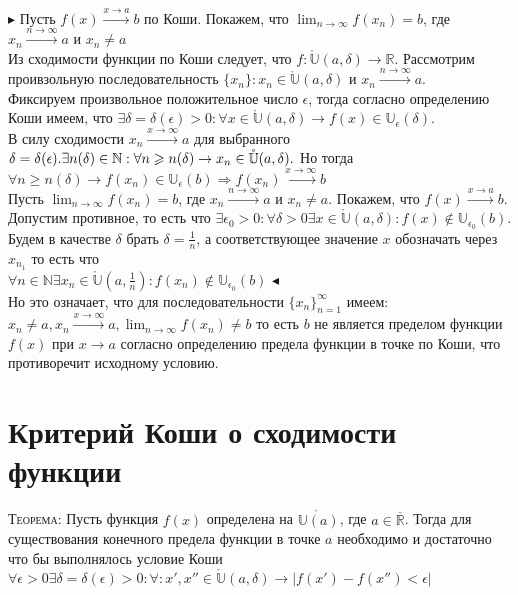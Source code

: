 \documentclass[14pt]{article}
\begin{document}
        $\blacktriangleright$ Пусть $f(x) \xrightarrow{x \rightarrow a} b $ по Коши. Покажем, что $\lim_{n \rightarrow \infty} f(x_n) = b$, где $x_n \xrightarrow{n\rightarrow \infty} a$ и $x_n \ne a$ \\  Из сходимости функции по Коши следует, что $f: \mathring{\mathbb{U}}(a, \delta) \rightarrow \mathbb{R}$. Рассмотрим проивзольную последовательность $\{x_n\} : x_n \in \mathring{\mathbb{U}}(a, \delta)$ и $x_n \xrightarrow{n \rightarrow \infty} a$.\\ Фиксируем произвольное положительное число $\epsilon$, тогда согласно определению Коши имеем, что $\exists \delta = \delta(\epsilon) > 0: \forall x \in \mathring{\mathbb{U}}(a,\delta) \rightarrow f(x) \in \mathbb{U}_\epsilon (\delta)$. \\ В силу сходимости $x_n \xrightarrow{x \rightarrow \infty} a $ для выбранного $\delta = \delta(\epsilon). \\ \exists n(\delta) \in \mathbb{N} : \forall n \geqslant n(\delta) \rightarrow x_n \in \mathring{\mathbb{U}}(a, \delta). $ Но тогда $\forall n \geqslant n(\delta) \rightarrow f(x_n) \in \mathbb{U}_\epsilon(b) \Rightarrow f(x_n) \xrightarrow{x\rightarrow\infty} b $ 
        \\ Пусть $\lim_{n\rightarrow \infty} f(x_n) = b$, где $x_n \xrightarrow{n\rightarrow \infty} a$ и $x_n \ne a$. Покажем, что $f(x) \xrightarrow{x\rightarrow a}b$. \\ Допустим противное, то есть что  $\exists \epsilon_0 > 0: \forall \delta > 0 \exists x \in \mathring{\mathbb{U}} (a, \delta) : f(x) \notin \mathbb{U}_{\epsilon_0}(b)$. \\  Будем в качестве $\delta$ брать $\delta=\frac{1}{n}$, а соответствующее значение $x$ обозначать через $x_{n_1} $ то есть что \\ $\forall n \in \mathbb{N} \exists x_n \in \mathring{\mathbb{U}} (a, \frac{1}{n}):f(x_n)\notin \mathbb{U}_{\epsilon_0}(b)$ $\blacktriangleleft$\\ Но это означает, что для последовательности $\{x_n\}^\infty_{n=1}$ имеем: $x_n \ne a, x_n \xrightarrow{x\rightarrow\infty} a, \lim_{n\rightarrow\infty} f(x_n) \ne b$ то есть $b$ не является пределом функции $f(x)$ при $x\rightarrow a$ согласно определению предела функции в точке по Коши, что противоречит исходному условию.

    \section{Критерий Коши о сходимости функции}
        \textsc{Теорема:} Пусть функция $f(x)$ определена на $\mathring{\mathbb{U}(a)}$, где $a \in \overline{\mathbb{R}}$. Тогда для существования конечного предела функции в точке $a$ необходимо и достаточно что бы выполнялось условие Коши $\forall \epsilon > 0 \exists \delta = \delta(\epsilon) > 0: \forall:x', x'' \in \mathring{\mathbb{U}}(a,\delta) \rightarrow |f(x') - f(x'') < \epsilon|$
        
\end{document}
